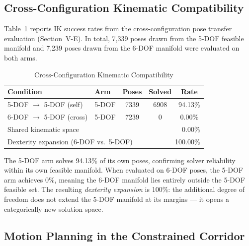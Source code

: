 \documentclass[conference]{IEEEtran}
\begin{document}
	\subsection{Cross-Configuration Kinematic Compatibility}
	
	Table~\ref{tab:cross_config} reports IK success rates from the
	cross-configuration pose transfer evaluation (Section~V-E).
	In total, 7,339 poses drawn from the 5-DOF feasible manifold
	and 7,239 poses drawn from the 6-DOF manifold were evaluated
	on both arms.
	
	\begin{table}[t]
		\centering
		\caption{Cross-Configuration Kinematic Compatibility}
		\label{tab:cross_config}
		\renewcommand{\arraystretch}{1.2}
		\small
		\begin{tabular}{llccc}
			\toprule
			\textbf{Condition} & \textbf{Arm} & \textbf{Poses} & \textbf{Solved} & \textbf{Rate} \\
			\midrule
			5-DOF $\rightarrow$ 5-DOF (self)  & 5-DOF & 7339 & 6908 & 94.13\% \\
			6-DOF $\rightarrow$ 5-DOF (cross) & 5-DOF & 7239 &    0 &  0.00\% \\
			\midrule
			\multicolumn{3}{l}{Shared kinematic space}                  & \multicolumn{2}{r}{0.00\%}   \\
			\multicolumn{3}{l}{Dexterity expansion (6-DOF vs.\ 5-DOF)} & \multicolumn{2}{r}{100.00\%} \\
			\bottomrule
		\end{tabular}
	\end{table}
	
	The 5-DOF arm solves 94.13\% of its own poses, confirming
	solver reliability within its own feasible manifold. When
	evaluated on 6-DOF poses, the 5-DOF arm achieves 0\%, meaning
	the 6-DOF manifold lies entirely outside the 5-DOF feasible
	set. The resulting \textit{dexterity expansion} is 100\%: the
	additional degree of freedom does not extend the 5-DOF manifold
	at its margins — it opens a categorically new solution space.
	
	\subsection{Motion Planning in the Constrained Corridor}
	
\end{document}
